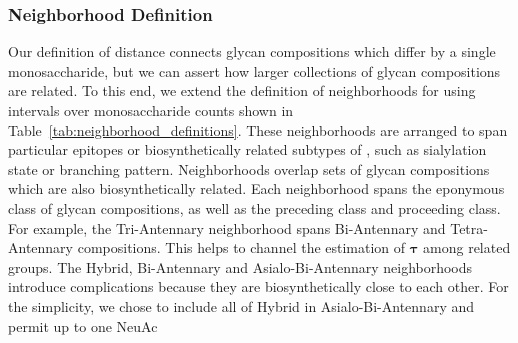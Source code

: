     \subsubsection{Neighborhood Definition}
        Our definition of distance connects glycan compositions which differ
        by a single monosaccharide, but we can assert how larger collections of
        glycan compositions are related. To this end, we extend the definition of
        neighborhoods for \nglycans using intervals over monosaccharide counts
        shown in Table~\ref{tab:neighborhood_definitions}. These neighborhoods are
        arranged to span particular epitopes or biosynthetically related
        subtypes of \nglycans, such as sialylation state or branching
        pattern. Neighborhoods overlap sets of glycan compositions which are also
        biosynthetically related. Each neighborhood spans the eponymous class of
        glycan compositions, as well as the preceding class and proceeding class.
        For example, the Tri-Antennary neighborhood spans Bi-Antennary and
        Tetra-Antennary compositions. This helps to channel the estimation of
        $\mathbf{\tau}$ among related groups.
        The Hybrid, Bi-Antennary and Asialo-Bi-Antennary neighborhoods introduce
        complications because they are biosynthetically close to each other. For the
        simplicity, we chose to include all of Hybrid in Asialo-Bi-Antennary
        and permit up to one NeuAc  

